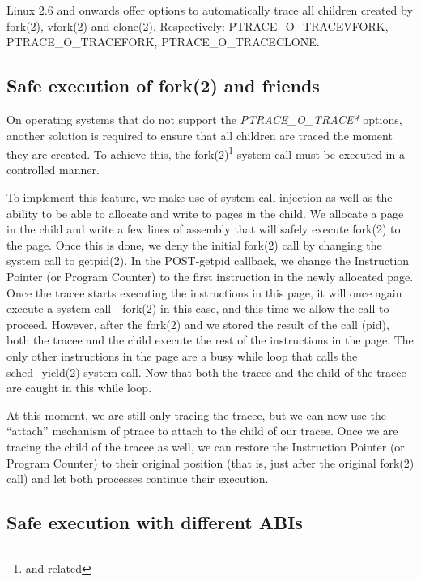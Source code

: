 \documentclass[a4paper, twoside, 10pt, twocolumn]{report}
\begin{document}
Linux 2.6 and onwards offer options to automatically trace all children
created by fork(2), vfork(2) and clone(2). Respectively:
PTRACE\_O\_TRACEVFORK, PTRACE\_O\_TRACEFORK, PTRACE\_O\_TRACECLONE.



\subsection{Safe execution of fork(2) and friends}

On operating systems that do not support the \textit{PTRACE\_O\_TRACE*} options,
another solution is required to ensure that all children are traced the moment
they are created. To achieve this, the fork(2)\footnote{and related} system call
must be executed in a controlled manner.

To implement this feature, we make use of system call injection as well as the
ability to be able to allocate and write to pages in the child. We allocate a
page in the child and write a few lines of assembly that will safely execute
fork(2) to the page. Once this is done, we deny the initial fork(2) call by
changing the system call to getpid(2). In the POST-getpid callback, we change
the Instruction Pointer (or Program Counter) to the first instruction in the
newly allocated page. Once the tracee starts executing the instructions in this
page, it will once again execute a system call - fork(2) in this case, and this
time we allow the call to proceed. However, after the fork(2) and we stored the
result of the call (pid), both the tracee and the child execute the rest of the
instructions in the page. The only other instructions in the page are a busy
while loop that calls the sched\_yield(2) system call. Now that both the tracee
and the child of the tracee are caught in this while loop.

At this moment, we are still only tracing the tracee, but we can now use the
``attach'' mechanism of ptrace to attach to the child of our tracee. Once we are
tracing the child of the tracee as well, we can restore the Instruction Pointer
(or Program Counter) to their original position (that is, just after the
original fork(2) call) and let both processes continue their execution.


\subsection{Safe execution with different ABIs}
\end{document}
